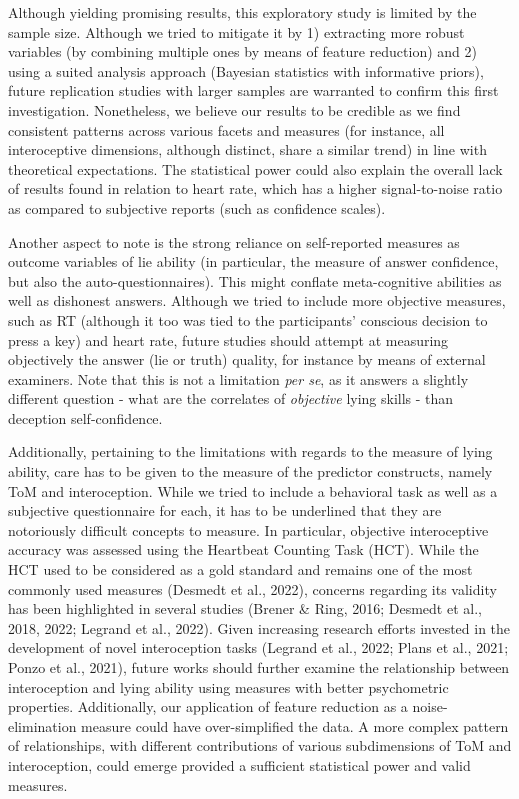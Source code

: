 \documentclass[
  man,mask,floatsintext]{apa6}
\begin{document}
Although yielding promising results, this exploratory study is limited by the sample size. Although we tried to mitigate it by 1) extracting more robust variables (by combining multiple ones by means of feature reduction) and 2) using a suited analysis approach (Bayesian statistics with informative priors), future replication studies with larger samples are warranted to confirm this first investigation. Nonetheless, we believe our results to be credible as we find consistent patterns across various facets and measures (for instance, all interoceptive dimensions, although distinct, share a similar trend) in line with theoretical expectations. The statistical power could also explain the overall lack of results found in relation to heart rate, which has a higher signal-to-noise ratio as compared to subjective reports (such as confidence scales).

Another aspect to note is the strong reliance on self-reported measures as outcome variables of lie ability (in particular, the measure of answer confidence, but also the auto-questionnaires). This might conflate meta-cognitive abilities as well as dishonest answers. Although we tried to include more objective measures, such as RT (although it too was tied to the participants' conscious decision to press a key) and heart rate, future studies should attempt at measuring objectively the answer (lie or truth) quality, for instance by means of external examiners. Note that this is not a limitation \emph{per se}, as it answers a slightly different question - what are the correlates of \emph{objective} lying skills - than deception self-confidence.

Additionally, pertaining to the limitations with regards to the measure of lying ability, care has to be given to the measure of the predictor constructs, namely ToM and interoception. While we tried to include a behavioral task as well as a subjective questionnaire for each, it has to be underlined that they are notoriously difficult concepts to measure. In particular, objective interoceptive accuracy was assessed using the Heartbeat Counting Task (HCT). While the HCT used to be considered as a gold standard and remains one of the most commonly used measures (Desmedt et al., 2022), concerns regarding its validity has been highlighted in several studies (Brener \& Ring, 2016; Desmedt et al., 2018, 2022; Legrand et al., 2022). Given increasing research efforts invested in the development of novel interoception tasks (Legrand et al., 2022; Plans et al., 2021; Ponzo et al., 2021), future works should further examine the relationship between interoception and lying ability using measures with better psychometric properties. Additionally, our application of feature reduction as a noise-elimination measure could have over-simplified the data. A more complex pattern of relationships, with different contributions of various subdimensions of ToM and interoception, could emerge provided a sufficient statistical power and valid measures.
\end{document}
